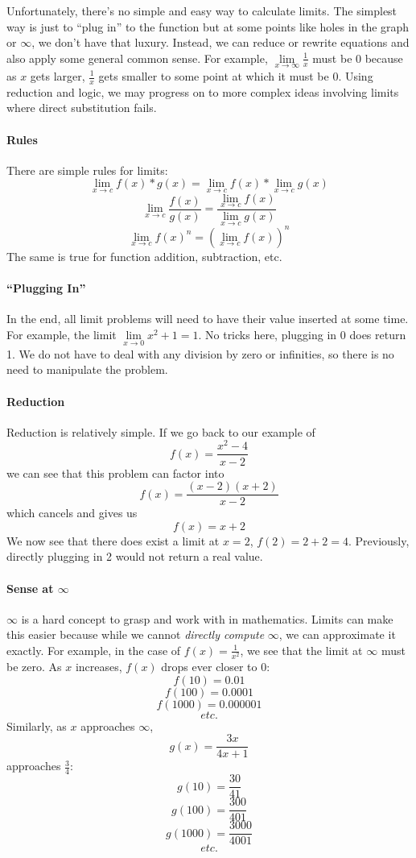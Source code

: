 \documentclass[../revisedMain.tex]{subfiles}
\begin{document}
Unfortunately, there's no simple and easy way to calculate limits. The simplest way is just to ``plug in'' to the function but at some points like holes in the graph or $\infty$, we don't have that luxury. Instead, we can reduce or rewrite equations and also apply some general common sense. For example, $\lim\limits_{x\to\infty} \frac{1}{x}$ must be 0 because as $x$ gets larger, $\frac{1}{x}$ gets smaller to some point at which it must be 0. Using reduction and logic, we may progress on to more complex ideas involving limits where direct substitution fails.
\paragraph{Rules} There are simple rules for limits: $$\lim_{x\to c} f(x)*g(x) = \lim_{x\to c} f(x) * \lim_{x\to c} g(x)$$$$\lim_{x\to c} \frac{f(x)}{g(x)} = \frac{\lim\limits_{x\to c} f(x)}{\lim\limits_{x\to c} g(x)}$$$$\lim_{x\to c} f(x)^n = \left(\lim_{x\to c} f(x)\right)^n$$
The same is true for function addition, subtraction, etc.
\paragraph{``Plugging In''} In the end, all limit problems will need to have their value inserted at some time. For example, the limit $\lim\limits_{x\to 0} x^2+1=1$. No tricks here, plugging in 0 does return 1. We do not have to deal with any division by zero or infinities, so there is no need to manipulate the problem.
\paragraph{Reduction} Reduction is relatively simple. If we go back to our example of $$f(x)=\frac{x^2-4}{x-2}$$ we can see that this problem can factor into $$f(x)=\frac{(x-2)(x+2)}{x-2}$$ which cancels and gives us $$f(x)=x+2$$We now see that there does exist a limit at $x=2$, $f(2)=2+2=4$. Previously, directly plugging in 2 would not return a real value.
\paragraph{Sense at $\infty$} $\infty$ is a hard concept to grasp and work with in mathematics. Limits can make this easier because while we cannot \textit{directly compute} $\infty$, we can approximate it exactly. For example, in the case of $f(x)=\displaystyle\frac{1}{x^2}$, we see that the limit at $\infty$ must be zero. As $x$ increases, $f(x)$ drops ever closer to 0:$$f(10)=0.01$$$$f(100)=0.0001$$$$f(1000)=0.000001$$$$etc.$$ Similarly, as $x$ approaches $\infty$, $$g(x)=\frac{3x}{4x+1}$$ approaches $\frac{3}{4}$: $$g(10)=\frac{30}{41}$$$$g(100)=\frac{300}{401}$$$$g(1000)=\frac{3000}{4001}$$$$etc.$$
\newpage
\end{document}
